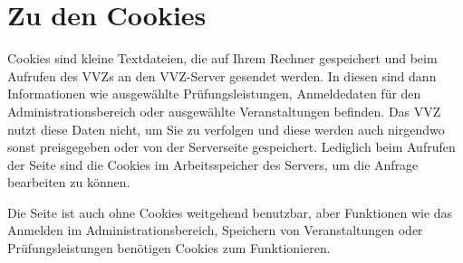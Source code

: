 \section{Zu den Cookies}

\begin{technisches}
Cookies sind kleine Textdateien, die auf Ihrem Rechner gespeichert und beim Aufrufen des VVZs an den
VVZ-Server gesendet werden. In diesen sind dann Informationen wie ausgewählte Prüfungsleistungen, Anmeldedaten
für den Administrationsbereich oder ausgewählte Veranstaltungen befinden. Das VVZ nutzt diese Daten nicht, um
Sie zu verfolgen und diese werden auch nirgendwo sonst preisgegeben oder von der Serverseite gespeichert.
Lediglich beim Aufrufen der Seite sind die Cookies im Arbeitsspeicher des Servers, um die Anfrage
bearbeiten zu können.

Die Seite ist auch ohne Cookies weitgehend benutzbar, aber Funktionen wie das Anmelden im Administrationsbereich,
Speichern von Veranstaltungen oder Prüfungsleistungen benötigen Cookies zum Funktionieren.
\end{technisches}



